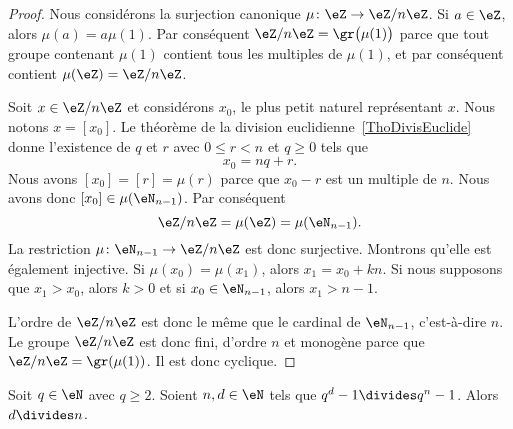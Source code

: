 \begin{proof}
    Nous considérons la surjection canonique \( \mu\colon \eZ\to \eZ/n\eZ\). Si \( a\in\eZ\), alors \( \mu(a)=a\mu(1)\). Par conséquent \( \eZ/n\eZ=\gr\bigl( \mu(1) \bigr)\) parce que tout groupe contenant \( \mu(1)\) contient tous les multiples de \( \mu(1)\), et par conséquent contient \( \mu(\eZ)=\eZ/n\eZ\).

    Soit \( x\in\eZ/n\eZ\) et considérons \( x_0\), le plus petit naturel représentant \( x\). Nous notons \( x=[x_0]\). Le théorème de la division euclidienne~\ref{ThoDivisEuclide} donne l'existence de \( q\) et \( r\) avec \( 0\leq r<n\) et \( q\geq 0\) tels que
    \begin{equation}
        x_0=nq+r.
    \end{equation}
    Nous avons \( [x_0]=[r]=\mu(r)\) parce que \( x_0-r\) est un multiple de \( n\). Nous avons donc \( [x_0]\in\mu(\eN_{n-1})\). Par conséquent
    \begin{equation}
        \eZ/n\eZ=\mu(\eZ)=\mu(\eN_{n-1}).
    \end{equation}
    La restriction \( \mu\colon \eN_{n-1}\to \eZ/n\eZ\) est donc surjective. Montrons qu'elle est également injective. Si \( \mu(x_0)=\mu(x_1)\), alors \( x_1=x_0+kn\). Si nous supposons que \( x_1>x_0\), alors \( k>0\) et si \( x_0\in\eN_{n-1}\), alors \( x_1>n-1\).

    L'ordre de \( \eZ/n\eZ\) est donc le même que le cardinal de \( \eN_{n-1}\), c'est-à-dire \( n\). Le groupe \( \eZ/n\eZ\) est donc fini, d'ordre \( n\) et monogène parce que \( \eZ/n\eZ=\gr(\mu(1))\). Il est donc cyclique.
\end{proof}

\begin{lemma}
    Soit \( q\in \eN\) avec \( q\geq 2\). Soient \( n,d\in \eN\) tels que \( q^d-1\divides q^n-1\). Alors \( d\divides n\).
\end{lemma}

